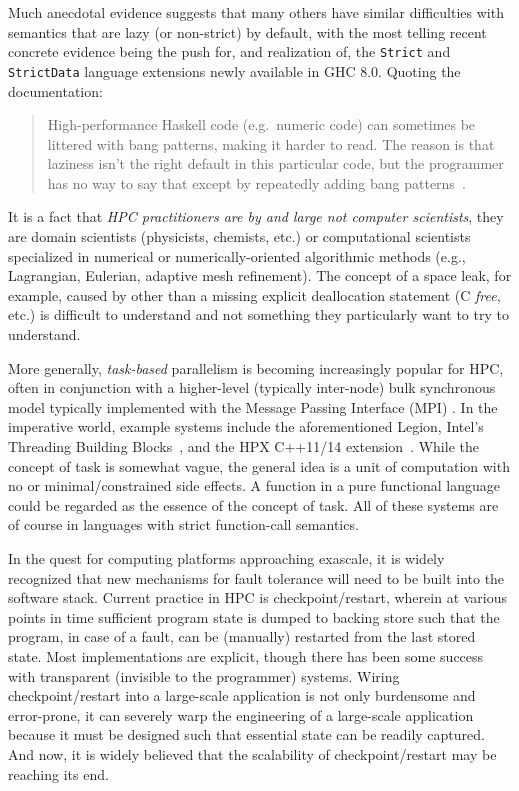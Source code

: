 \documentclass{llncs}
\begin{document}
Much anecdotal evidence suggests that many others have similar difficulties
with semantics that are lazy (or non-strict) by default, with the most telling
recent concrete evidence being the push for, and realization of, the
\texttt{Strict} and \texttt{StrictData} language extensions newly available in
GHC 8.0.  Quoting the documentation:
\begin{quote}
  High-performance Haskell code (e.g.\ numeric code) can sometimes be littered
  with bang patterns, making it harder to read. The reason is that laziness
  isn't the right default in this particular code, but the programmer has no
  way to say that except by repeatedly adding bang
  patterns~\cite{strict-strictdata}.
\end{quote}
It is a fact that \emph{HPC practitioners are by and large not computer
  scientists}, they are domain scientists (physicists, chemists, etc.) or
computational scientists specialized in numerical or numerically-oriented
algorithmic methods (e.g., Lagrangian, Eulerian, adaptive mesh refinement).
The concept of a space leak, for example, caused by other than a missing
explicit deallocation statement (C \emph{free}, etc.) is difficult to
understand and not something they particularly want to try to understand.

More generally, \emph{task-based} parallelism is becoming increasingly popular
for HPC, often in conjunction with a higher-level (typically inter-node) bulk
synchronous model typically implemented with the Message Passing Interface
(MPI) \cite{MPI}.  In the imperative world, example systems include the
aforementioned Legion, Intel's Threading Building Blocks~\cite{Reinders:2007},
and the HPX C++11/14 extension~\cite{HPX}.  While the concept of task is
somewhat vague, the general idea is a unit of computation with no or
minimal/constrained side effects.  A function in a pure functional language
could be regarded as the essence of the concept of task.  All of these
systems are of course in languages with strict function-call semantics.

In the quest for computing platforms approaching exascale, it is widely
recognized that new mechanisms for fault tolerance will need to be built into
the software stack.  Current practice in HPC is checkpoint/restart, wherein at
various points in time sufficient program state is dumped to backing store such
that the program, in case of a fault, can be (manually) restarted from the
last stored state.  Most implementations are explicit, though there has been
some success with transparent (invisible to the programmer) systems.  Wiring
checkpoint/restart into a large-scale application is not only burdensome and
error-prone, it can severely warp the engineering of a large-scale application
because it must be designed such that essential state can be readily captured.
And now, it is widely believed that the scalability of checkpoint/restart may
be reaching its end.
\end{document}
